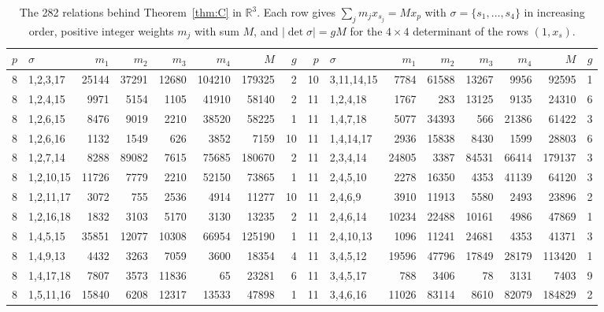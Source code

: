 \begin{table}[tp]
\scriptsize
\caption{The 282 relations behind Theorem~\ref{thm:C} in $\mathbb{R}^3$. Each row gives $\sum_j m_j x_{s_j}=M x_p$ with $\sigma=\{s_1,\dots,s_4\}$ in increasing order, positive integer weights $m_j$ with sum $M$, and $|\det\sigma|=gM$ for the $4\times4$ determinant of the rows $(1,x_s)$.}\label{tab:certCthree}
\begin{ruledtabular}
\begin{tabular}{rlrrrrrr@{\hspace{2.2em}}rlrrrrrr}
$p$ & $\sigma$ & $m_1$ & $m_2$ & $m_3$ & $m_4$ & $M$ & $g$ & $p$ & $\sigma$ & $m_1$ & $m_2$ & $m_3$ & $m_4$ & $M$ & $g$ \\ \hline
8 & 1,2,3,17 & 25144 & 37291 & 12680 & 104210 & 179325 & 2 & 10 & 3,11,14,15 & 7784 & 61588 & 13267 & 9956 & 92595 & 1 \\
8 & 1,2,4,15 & 9971 & 5154 & 1105 & 41910 & 58140 & 2 & 11 & 1,2,4,18 & 1767 & 283 & 13125 & 9135 & 24310 & 6 \\
8 & 1,2,6,15 & 8476 & 9019 & 2210 & 38520 & 58225 & 1 & 11 & 1,4,7,18 & 5077 & 34393 & 566 & 21386 & 61422 & 3 \\
8 & 1,2,6,16 & 1132 & 1549 & 626 & 3852 & 7159 & 10 & 11 & 1,4,14,17 & 2936 & 15838 & 8430 & 1599 & 28803 & 6 \\
8 & 1,2,7,14 & 8288 & 89082 & 7615 & 75685 & 180670 & 2 & 11 & 2,3,4,14 & 24805 & 3387 & 84531 & 66414 & 179137 & 3 \\
8 & 1,2,10,15 & 11726 & 7779 & 2210 & 52150 & 73865 & 1 & 11 & 2,4,5,10 & 2278 & 16350 & 4353 & 41139 & 64120 & 3 \\
8 & 1,2,11,17 & 3072 & 755 & 2536 & 4914 & 11277 & 10 & 11 & 2,4,6,9 & 3910 & 11913 & 5580 & 2493 & 23896 & 2 \\
8 & 1,2,16,18 & 1832 & 3103 & 5170 & 3130 & 13235 & 2 & 11 & 2,4,6,14 & 10234 & 22488 & 10161 & 4986 & 47869 & 1 \\
8 & 1,4,5,15 & 35851 & 12077 & 10308 & 66954 & 125190 & 1 & 11 & 2,4,10,13 & 1096 & 11241 & 24681 & 4353 & 41371 & 3 \\
8 & 1,4,9,13 & 4432 & 3263 & 7059 & 3600 & 18354 & 4 & 11 & 3,4,5,12 & 19596 & 47796 & 17849 & 28179 & 113420 & 1 \\
8 & 1,4,17,18 & 7807 & 3573 & 11836 & 65 & 23281 & 6 & 11 & 3,4,5,17 & 788 & 3406 & 78 & 3131 & 7403 & 9 \\
8 & 1,5,11,16 & 15840 & 6208 & 12317 & 13533 & 47898 & 1 & 11 & 3,4,6,16 & 11026 & 83114 & 8610 & 82079 & 184829 & 2 \\

\end{tabular}
\end{ruledtabular}
\end{table}
